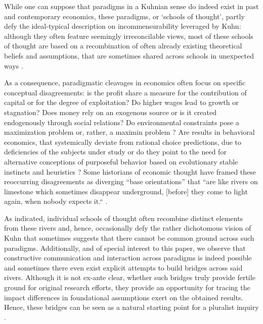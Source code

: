 \documentclass{article}
\begin{document}
While one can suppose that paradigms in a Kuhnian sense do indeed exist in past and contemporary economics, these paradigms, or ‘schools of thought’, partly defy the ideal-typical description on incommensurability leveraged by Kuhn: although they often feature seemingly irreconcilable views, most of these schools of thought are based on a recombination of often already existing theoretical beliefs and assumptions, that are sometimes shared across schools in unexpected ways \citep[e.g.][]{Kaldor1961,Lawson1985}.

As a consequence, paradigmatic cleavages in economics often focus on specific conceptual disagreements: is the profit share a measure for the contribution of capital or for the degree of exploitation? Do higher wages lead to growth or stagnation? Does money rely on an exogenous source or is it created endogenously through social relations? Do environmental constraints pose a maximization problem or, rather, a maximin problem \citep{Costanza.1989}? Are results in behavioral economics, that systemically deviate from rational choice predictions, due to deficiencies of the subjects under study \citep{Gintis.2010} or do they point to the need for alternative conceptions of purposeful behavior based on evolutionary stable instincts and heuristics \citep{gigerenzer1999simple}? Some historians of economic thought have framed these reoccurring disagreements as diverging “base orientations” that “are like rivers on limestone which sometimes disappear underground, [before] they come to light again, when nobody expects it.“ \citep[][p. 9]{Screpanti2005}.

As indicated, individual schools of thought often recombine distinct elements from these rivers and, hence, occasionally defy the rather dichotomous vision of Kuhn that sometimes suggests that there cannot be common ground across such paradigms. Additionally, and of special interest to this paper, we observe that constructive communication and interaction across paradigms is indeed possible and sometimes there even exist explicit attempts to build bridges across said rivers. Although it is not ex-ante clear, whether such bridges truly provide fertile ground for original research efforts, they provide an opportunity for tracing the impact differences in foundational assumptions exert on the obtained results. Hence, these bridges can be seen as a natural starting point for a pluralist inquiry \citep[see also][]{Dobusch.2012}.
\end{document}
